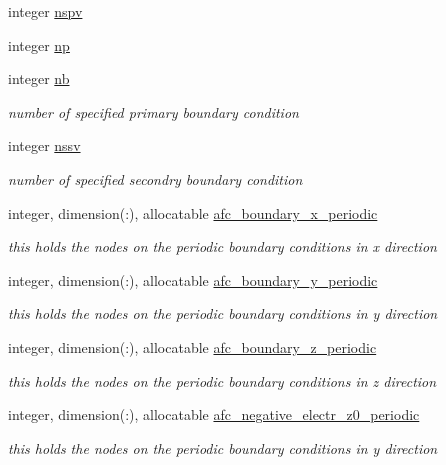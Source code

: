 \begin{DoxyCompactItemize}
integer \hyperlink{classfem__geometry_a3b8fb7129bee07e65960792aed717c62}{nspv}
\item 
integer \hyperlink{classfem__geometry_ab7f36fef3fec78be93a61db40f160efe}{np}
\item 
integer \hyperlink{classfem__geometry_aa893111b8f89f4acf9d5a72a2fd4b654}{nb}
\begin{DoxyCompactList}\small\item\em number of specified primary boundary condition \end{DoxyCompactList}\item 
integer \hyperlink{classfem__geometry_a8bf4a1e80679f4f0210ae0e043fca048}{nssv}
\begin{DoxyCompactList}\small\item\em number of specified secondry boundary condition \end{DoxyCompactList}\item 
integer, dimension(\+:), allocatable \hyperlink{classfem__geometry_a05ff2f67adfb0c3d1075709011f86a07}{afc\+\_\+boundary\+\_\+x\+\_\+periodic}
\begin{DoxyCompactList}\small\item\em this holds the nodes on the periodic boundary conditions in x direction \end{DoxyCompactList}\item 
integer, dimension(\+:), allocatable \hyperlink{classfem__geometry_aee47a709c80c5c2f1c97439b877014c5}{afc\+\_\+boundary\+\_\+y\+\_\+periodic}
\begin{DoxyCompactList}\small\item\em this holds the nodes on the periodic boundary conditions in y direction \end{DoxyCompactList}\item 
integer, dimension(\+:), allocatable \hyperlink{classfem__geometry_ae3a7dff93ccfa3f2c34ddb20b0be1389}{afc\+\_\+boundary\+\_\+z\+\_\+periodic}
\begin{DoxyCompactList}\small\item\em this holds the nodes on the periodic boundary conditions in z direction \end{DoxyCompactList}\item 
integer, dimension(\+:), allocatable \hyperlink{classfem__geometry_a9a7514f02cd379a92b365cf0ef34b9c6}{afc\+\_\+negative\+\_\+electr\+\_\+z0\+\_\+periodic}
\begin{DoxyCompactList}\small\item\em this holds the nodes on the periodic boundary conditions in y direction \end{DoxyCompactList}\item 

\end{DoxyCompactItemize}
